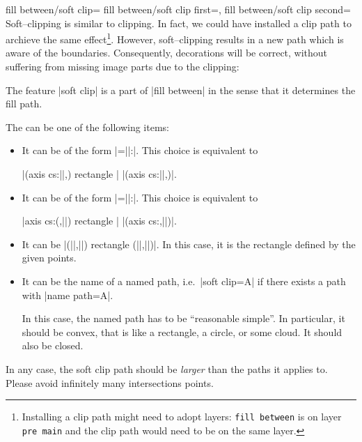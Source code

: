 \begin{tikzkeylist}{%
	fill between/soft clip=
	fill between/soft clip first=,
	fill between/soft clip second=%
}
	Soft--clipping is similar to clipping. In fact, we could have installed a clip path to archieve the same effect\footnote{Installing a clip path might need to adopt layers: \texttt{fill between} is on layer \texttt{pre main} and the clip path would need to be on the same layer.}. However, soft--clipping results in a new path which is aware of the boundaries. Consequently, decorations will be correct, without suffering from missing image parts due to the clipping:
\begin{codeexample}[]
\end{codeexample}

	The feature |soft clip| is a part of |fill between| in the sense that it determines the fill path.

	The  can be one of the following items:
	\begin{itemize}
		\item It can be of the form |=||:|. This choice is equivalent to

			|(axis cs:||,) rectangle |
			|(axis cs:||,)|.
		\item It can be of the form |=||:|. This choice is equivalent to

			|axis cs:(,||) rectangle |
			|(axis cs:,||)|.
		\item It can be |(||,||) rectangle (||,||)|. In this case, it is the rectangle defined by the given points.
		\item It can be the name of a named path, i.e.\ |soft clip=A| if there exists a path with |name path=A|.

		In this case, the named path has to be ``reasonable simple''. In particular, it should be convex, that is like a rectangle, a circle, or some cloud. It should also be closed.
	\end{itemize}
	In any case, the soft clip path should be \emph{larger} than the paths it applies to. Please avoid infinitely many intersections points.


\end{tikzkeylist}
